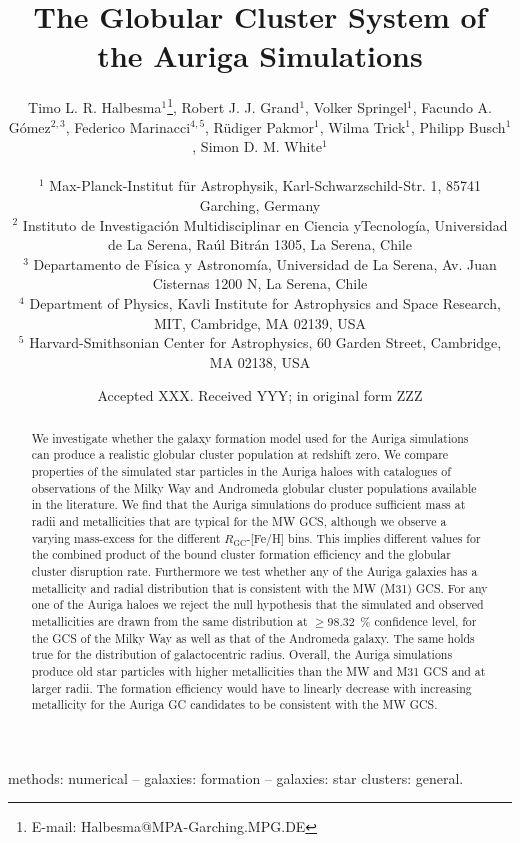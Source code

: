 \documentclass[a4paper,fleqn,usenatbib]{mnras}
\title[Auriga GCS]{The Globular Cluster System of the Auriga Simulations}
\author[T. L. R. Halbesma et al.]{\parbox[t]{\textwidth}{
    Timo L. R. Halbesma$^{1}$\thanks{E-mail: Halbesma@MPA-Garching.MPG.DE},
    Robert J. J. Grand$^{1}$,
    Volker Springel$^{1}$,
    Facundo A. G\'{o}mez$^{2,3}$,
    Federico Marinacci$^{4,5}$,
    R\"{u}diger Pakmor$^{1}$,
    Wilma Trick$^{1}$,
    Philipp Busch$^{1}$,
    Simon D. M. White$^{1}$
} \vspace{10pt} \\
$^{1}$ Max-Planck-Institut f\"ur Astrophysik, Karl-Schwarzschild-Str. 1,
    85741 Garching, Germany \\
$^{2}$ Instituto de Investigaci\'{o}n Multidisciplinar en Ciencia yTecnolog\'{i}a,
    Universidad de La Serena, Ra\'{u}l Bitr\'{a}n 1305, La Serena, Chile \\
$^{3}$ Departamento de F\'{i}sica y Astronom\'{i}a, Universidad de La Serena, Av.
    Juan Cisternas 1200 N, La Serena, Chile \\
$^{4}$ Department of Physics, Kavli Institute for Astrophysics and Space Research,
    MIT, Cambridge, MA 02139, USA \\
$^{5}$ Harvard-Smithsonian Center for Astrophysics, 60 Garden Street, Cambridge,
    MA 02138, USA \\
}
\date{Accepted XXX. Received YYY; in original form ZZZ}
\begin{document}
\label{firstpage}
\pagerange{\pageref{firstpage}--\pageref{lastpage}}
\maketitle

\begin{abstract}
We investigate whether the galaxy formation model used for the Auriga simulations
can produce a realistic globular cluster population at redshift zero. We compare
properties of the simulated star particles in the Auriga haloes with catalogues
of observations of the Milky Way and Andromeda globular cluster populations available
in the literature. We find that the Auriga simulations do produce sufficient mass
at radii and metallicities that are typical for the MW GCS, although we observe
a varying mass-excess for the different $R_{\text{GC}}$-[Fe/H] bins. This implies
different values for the combined product of the bound cluster formation efficiency
and the globular cluster disruption rate. Furthermore we test whether any of the
Auriga galaxies has a metallicity and radial distribution that is consistent with
the MW (M31) GCS. For any one of the Auriga haloes we reject the null hypothesis that
the simulated and observed metallicities are drawn from the same distribution at
$\geq98.32$~\% confidence level, for the GCS of the Milky Way as well as that of
the Andromeda galaxy. The same holds true for the distribution of galactocentric
radius. Overall, the Auriga simulations produce old star particles with higher
metallicities than the MW and M31 GCS and at larger radii. The formation efficiency
would have to linearly decrease with increasing metallicity for the Auriga GC
candidates to be consistent with the MW GCS.
\end{abstract}

\begin{keywords}
methods: numerical -- galaxies: formation -- galaxies: star clusters: general.
\end{keywords}


\end{document}
